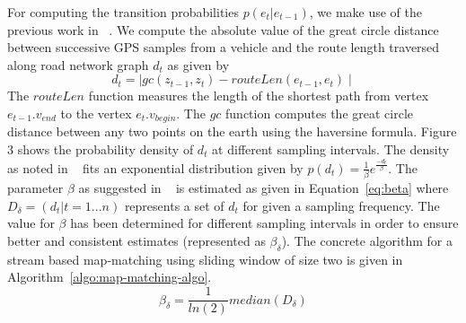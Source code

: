 \documentclass{wscpaperproc}
\theoremstyle{wsc}
\begin{document}
For computing the transition probabilities $p(e_{t}|e_{t-1})$, we make use of the previous work in ~\cite{newson2009hidden}. We compute the absolute value of the great circle distance between successive GPS samples from a vehicle and the route length traversed along road network graph $d_{t}$ as given by 
\begin{equation}
d_{t}=\mid gc(z_{t-1},z_{t})- routeLen(e_{t-1},e_{t})\mid
\end{equation}
The $routeLen$ function measures the length of the shortest path from vertex $e_{t-1}.v_{end}$ to the vertex $e_{t}.v_{begin}$. The $gc$ function computes the great circle distance between any two points on the earth using the haversine formula. Figure 3 shows the probability density of $d_{t}$ at different sampling intervals. The density as noted in ~\cite{newson2009hidden} fits an exponential distribution given by $p(d_{t})=\frac{1}{\beta}e^{\frac{-d_{t}}{\beta}}$. The parameter $\beta$ as suggested in ~\cite{newson2009hidden} is estimated as given in  Equation~\ref{eq:beta} where $D_{\delta}=(d_{t}|t=1 ... n)$ represents a set of $d_{t}$ for given a sampling frequency. The value for $\beta$ has been determined for different sampling intervals in order to ensure better and consistent estimates (represented as $\beta_{\delta}$). The concrete algorithm for a stream based map-matching using sliding window of size two is given in Algorithm~\ref{algo:map-matching-algo}.
\begin{equation}
\label{eq:beta}
\beta_{\delta}=\frac{1}{ln(2)}median(D_{\delta})
\end{equation}
\end{document}
